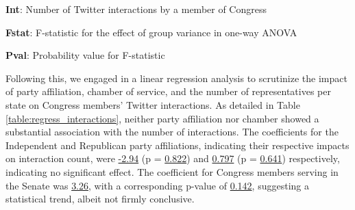 \documentclass[11pt]{article}
\begin{document}
\begin{table}[h]
\caption{\protect\hyperlink{file-table-1-pkl}{Analysis of variance for number of interactions grouped by States}}
\label{table:anova_interactions}
\begin{threeparttable}
\renewcommand{\TPTminimum}{\linewidth}
\begin{tablenotes}
\footnotesize
\item \textbf{Int}: Number of Twitter interactions by a member of Congress
\item \textbf{Fstat}: F-statistic for the effect of group variance in one-way ANOVA
\item \textbf{Pval}: Probability value for F-statistic
\end{tablenotes}
\end{threeparttable}
\end{table}


Following this, we engaged in a linear regression analysis to scrutinize the impact of party affiliation, chamber of service, and the number of representatives per state on Congress members' Twitter interactions. As detailed in Table \ref{table:regress_interactions}, neither party affiliation nor chamber showed a substantial association with the number of interactions. The coefficients for the Independent and Republican party affiliations, indicating their respective impacts on interaction count, were \hyperlink{B2a}{-2.94} (p = \hyperlink{B2b}{0.822}) and \hyperlink{B3a}{0.797} (p = \hyperlink{B3b}{0.641}) respectively, indicating no significant effect. The coefficient for Congress members serving in the Senate was \hyperlink{B4a}{3.26}, with a corresponding p-value of \hyperlink{B4b}{0.142}, suggesting a statistical trend, albeit not firmly conclusive.
\end{document}
